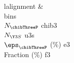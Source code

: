 \begin{tabu}{l{{alignment}}}
&  \\
{{bins}} \\
\hline
$N_{\chibThreeP}$ {{chib3}} \\
$N_{\Y3S}$ {{u3s}} \\
$\eps_{\chibThreeP}$ (\%) {{e3}} \\
Fraction \chibThreeP (\%) {{f3}} \\
\end{tabu}